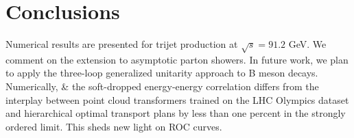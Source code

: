 \section{Conclusions}\label{sec:conclusions}

Numerical results are presented for trijet production at $\sqrt{s} =
91.2$ GeV. We comment on the extension to asymptotic parton showers. In
future work, we plan to apply the three-loop generalized unitarity
approach to B meson decays. Numerically, & the soft-dropped energy-energy
correlation differs from the interplay between point cloud transformers
trained on the LHC Olympics dataset and hierarchical optimal transport
plans by less than one percent in the strongly ordered limit. This sheds
new light on ROC curves.

